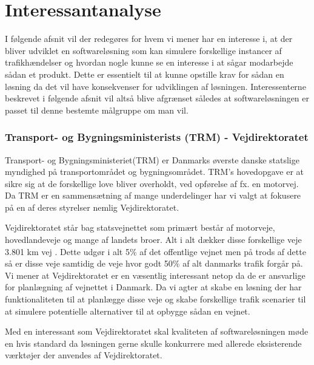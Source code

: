 \chapter{Interessantanalyse}\label{Interessentanalyse}

I følgende afsnit vil der redegøres for hvem vi mener har en interesse i, at der bliver udviklet en softwareløsning som kan simulere forskellige instancer af trafikhændelser og hvordan nogle kunne se en interesse i at sågar modarbejde sådan et produkt. Dette er essentielt til at kunne opstille krav for sådan en løsning da det vil have konsekvenser for udviklingen af løsningen. Interessenterne beskrevet i følgende afsnit vil altså blive afgrænset således at softwareløsningen er passet til denne bestemte målgruppe om man vil.

\subsection {Transport- og Bygningsministerists (TRM) - Vejdirektoratet}\label{TRM}

Transport- og Bygningsministeriet(TRM) er Danmarks øverste danske statslige myndighed på transportområdet og bygningsområdet. TRM’s hovedopgave er at sikre sig at de forskellige love bliver overholdt, ved opførelse af fx. en motorvej. Da TRM er en sammensætning af mange underdelinger har vi valgt at fokusere på en af deres styrelser nemlig Vejdirektoratet.

\vspace{5mm}

Vejdirektoratet står bag statsvejnettet som primært består af motorveje, hovedlandeveje og mange af landets broer. Alt i alt dækker disse forskellige veje 3.801 km vej \cite{Vejdirektoratet}. Dette udgør i alt 5\% af det offentlige vejnet men på trods af dette så er disse veje samtidig de veje hvor godt 50\% af alt danmarks trafik forgår på. Vi mener at Vejdirektoratet er en væsentlig interessant netop da de er ansvarlige for planlægning af vejnettet i Danmark. Da vi agter at skabe en løsning der har funktionaliteten til at planlægge disse veje og skabe forskellige trafik scenarier til at simulere potentielle alternativer til at opbygge sådan en vejnet.

\vspace{5mm}

Med en interessant som Vejdirektoratet skal kvaliteten af softwareløsningen møde en hvis standard da løsningen gerne skulle konkurrere med allerede eksisterende værktøjer der anvendes af Vejdirektoratet.

